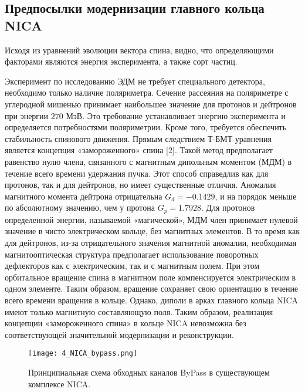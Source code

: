 \subsection{Предпосылки модернизации главного кольца NICA}\label{sec:EDM/Wien_filter/modernization}

\par Исходя из уравнений эволюции вектора спина, видно, что определяющими факторами являются энергия эксперимента, а также сорт частиц.

\par Эксперимент по исследованию ЭДМ не требует специального детектора, необходимо только наличие поляриметра. Сечение рассеяния на поляриметре с углеродной мишенью принимает наибольшее значение для протонов и дейтронов при энергии $270$ МэВ. Это требование устанавливает энергию эксперимента и определяется потребностями поляриметрии.
Кроме того, требуется обеспечить стабильность спинового движения. Прямым следствием Т-БМТ уравнения является концепция «замороженного» спина [2]. Такой метод предполагает равенство нулю члена, связанного с магнитным дипольным моментом (МДМ) в течение всего времени удержания пучка. Этот способ справедлив как для протонов, так и для дейтронов, но имеет существенные отличия. Аномалия магнитного момента дейтрона отрицательна $G_{d}=-0.1429$, и на порядок меньше по абсолютному значению, чем у протона $G_{p}=1.7928$. Для протонов определенной энергии, называемой «магической», МДМ член принимает нулевой значение в чисто электрическом кольце, без магнитных элементов. В то время как для дейтронов, из-за отрицательного значения магнитной аномалии, необходимая магнитооптическая структура предполагает использование поворотных дефлекторов как с электрическим, так и с магнитным полем. При этом орбитальное вращение спина в магнитном поле компенсируется электрическим в одном элементе. Таким образом, вращение сохраняет свою ориентацию в течение всего времени вращения в кольце. Однако, диполи в арках главного кольца NICA имеют только магнитную составляющую поля. Таким образом, реализация концепции «замороженного спина» в кольце NICA невозможна без соответствующей значительной модернизации и реконструкции.

\begin{figure}[!h]
  \centering
   \texttt{[image: 4\_NICA\_bypass.png]}
   \caption{Принципиальная схема обходных каналов ByPass в существующем комплексе NICA.}
   \label{fig:4_NICA_bypass}
\end{figure}


